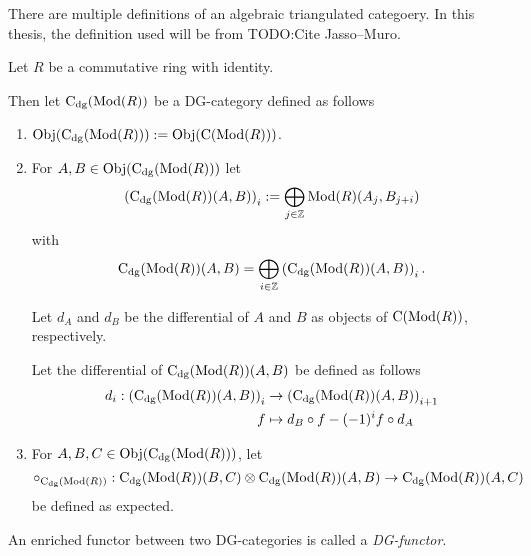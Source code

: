 There are multiple definitions of an algebraic triangulated categoery. In this thesis, the definition used will be from TODO:Cite Jasso--Muro.

\begin{definition}[\( \C_{\dg}(\Mod(R)) \)]
    Let \( R \) be a commutative ring with identity.

    Then let \emph{\( \C_{\dg}(\Mod(R)) \)} be a DG-category defined as follows
    \begin{enumerate}
        \item {
            \( \operatorname{Obj}(\operatorname{C}_{\operatorname{dg}}(\operatorname{Mod}(R))) := \operatorname{Obj}(\operatorname{C}(\operatorname{Mod}(R))) \).
        }
        \item {
            For \( A, B \in \operatorname{Obj}(\operatorname{C}_{\operatorname{dg}}(\operatorname{Mod}(R))) \) let
            \[ 
                \left( \operatorname{C}_{\operatorname{dg}}(\operatorname{Mod}(R))(A, B) \right)_i := \bigoplus_{j \in {\mathbb{Z}}} \operatorname{Mod}(R)(A_j, B_{j + i})
            \]
            with
            \[
                \operatorname{C}_{\operatorname{dg}}(\operatorname{Mod}(R))(A, B) = \bigoplus_{i \in {\mathbb{Z}}} \left( \operatorname{C}_{\operatorname{dg}}(\operatorname{Mod}(R))(A, B) \right)_i.
            \]

            Let \( d_A \) and \( d_B \) be the differential of \( A \) and \( B \) as objects of \( \operatorname{C}(\operatorname{Mod}(R)) \), respectively.

            Let the differential of \( \operatorname{C}_{\operatorname{dg}}(\operatorname{Mod}(R))(A, B) \) be defined as follows
            \begin{align*}
                d_i: \left( \operatorname{C}_{\operatorname{dg}}(\operatorname{Mod}(R))(A, B) \right)_i &\to \left( \operatorname{C}_{\operatorname{dg}}(\operatorname{Mod}(R))(A, B) \right)_{i + 1} \\
                f &\mapsto d_B \circ f - (-1)^i f \circ d_A
            \end{align*}
        }
        \item {
            For \( A, B, C \in \operatorname{Obj}(\operatorname{C}_{\operatorname{dg}}(\operatorname{Mod}(R))) \), let
            \[
                \circ_{\operatorname{C}_{\operatorname{dg}}(\operatorname{Mod}(R))}: \operatorname{C}_{\operatorname{dg}}(\operatorname{Mod}(R))(B, C) \otimes \operatorname{C}_{\operatorname{dg}}(\operatorname{Mod}(R))(A, B) \to \operatorname{C}_{\operatorname{dg}}(\operatorname{Mod}(R))(A, C)
            \]
            be defined as expected.
        }
    \end{enumerate}
\end{definition}

\begin{definition}[DG-functor]
    An enriched functor between two DG-categories is called a \emph{DG-functor}.
\end{definition}

